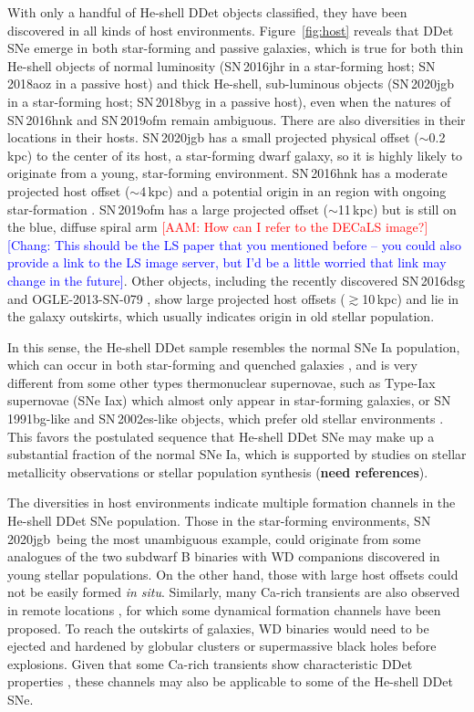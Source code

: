 \documentclass[twocolumn]{aastex631}
\newcommand{\sn}{SN\,2020jgb}
\newcommand{\adam}[1]{\textcolor{red}{[AAM: #1]}}
\newcommand{\chang}[1]{\textcolor{blue}{[Chang: #1]}}
\begin{document}
{With only a handful of He-shell DDet objects classified, they have been discovered in all kinds of host environments. Figure~\ref{fig:host} reveals that DDet SNe emerge in both star-forming and passive galaxies, which is true for both thin He-shell objects of normal luminosity (SN\,2016jhr in a star-forming host; SN\,2018aoz in a passive host) and thick He-shell, sub-luminous objects (SN\,2020jgb in a star-forming host; SN\,2018byg in a passive host), even when the natures of SN\,2016hnk and SN\,2019ofm remain ambiguous. There are also diversities in their locations in their hosts. SN\,2020jgb has a small projected physical offset ($\sim$0.2\,kpc) to the center of its host, a star-forming dwarf galaxy, so it is highly likely to originate from a young, star-forming environment. SN\,2016hnk has a moderate projected host offset ($\sim$4\,kpc) and a potential origin in an  region with ongoing star-formation \citep{galbany_16hnk_2019}. SN\,2019ofm has a large projected offset ($\sim$11\,kpc) but is still on the blue, diffuse spiral arm \adam{How can I refer to the DECaLS image?} \chang{This should be the LS paper that you mentioned before -- you could also provide a link to the LS image server, but I'd be a little worried that link may change in the future}. Other objects, including the recently discovered SN\,2016dsg and OGLE-2013-SN-079 \citep{Dong_16dsg_2022}, show large projected host offsets ($\gtrsim$10\,kpc) and lie in the galaxy outskirts, which usually indicates origin in old stellar population.

In this sense, the He-shell DDet sample resembles the normal SNe Ia population, which can occur in both star-forming and quenched galaxies \citep[e.g.,][]{Sullivan_2006, Smith_2012}, and is very different from some other types thermonuclear supernovae, such as Type-Iax supernovae (SNe Iax) which almost only appear in star-forming galaxies, or SN\,1991bg-like and SN\,2002es-like objects, which prefer old stellar environments \citep[see the review in][]{Jha_2019}. This favors the postulated sequence that He-shell DDet SNe may make up a substantial fraction of the normal SNe Ia, which is supported by studies on stellar metallicity observations \citep{Sanders_2021, Eitner_2022} or stellar population synthesis (\textbf{need references}).

The diversities in host environments indicate multiple formation channels in the He-shell DDet SNe population. Those in the star-forming environments, \sn\ being the most unambiguous example, could originate from some analogues of the two subdwarf B binaries with WD companions \citep{Geier_2013, Kupfer_2022} discovered in young stellar populations.
On the other hand, those with large host offsets could not be easily formed {\it in situ}. Similarly, many Ca-rich transients are also observed in remote locations \citep{Lunnan_2017}, for which some dynamical formation channels have been proposed. To reach the outskirts of galaxies, WD binaries would need to be ejected and hardened by globular clusters \citep{Shen_2019} or supermassive black holes \citep{Foley_2015} before explosions. Given that some Ca-rich transients show characteristic DDet properties \citep{de_Ca_rich_2020}, these channels may also be applicable to some of the He-shell DDet SNe. 

}
\end{document}

